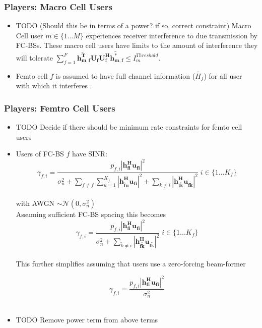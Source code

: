 \documentclass[12pt]{article}
\begin{document}
\subsubsection{Players: Macro Cell Users}

\begin{itemize}
\item 
TODO (Should this be in terms of a power? if so, correct constraint) 
Macro Cell user $m \in \{1 ... M\}$ experiences receiver interference to due transmission by FC-BSs. These macro cell users have limits to the amount of interference they will tolerate 
$\sum^F_{f=1} \mathbf{\tilde{h_{m,f}^T}}  \mathbf{U_f}  \mathbf{U_f^H} \mathbf{\tilde{h_{m,f}^*}} \leq I^{Threshold}_{m} $.

\item Femto cell $f$ is assumed to have full channel information ($\tilde{H_f}$) for all user with which it interferes .
\\
\end{itemize}


\subsubsection{Players: Femtro Cell Users}
\begin{itemize}


\item TODO Decide if there should be minimum rate constraints for femto cell users
\\

\item Users of FC-BS $f$ have SINR:
\begin{equation}
\gamma_{f,i} = \frac{p_{f,i}|\mathbf{h^H_{fi}u_{fi}}|^2}
{\sigma^2_{n}  + \sum_{\tilde{f}\neq f} \sum_{u=1}^{K_{\tilde{f}}}
|\mathbf{h^H_{\tilde{f}u}u_{fi}}|^2
 + \sum_{\tilde{k}\neq i}
  |\mathbf{h^H_{f\tilde{k}}u_{f\tilde{k}}}|^2}
  \; i \in \{1 ... K_f\}
\end{equation}
\\
with AWGN $\sim \mathcal{N}(0,\sigma^2_n)$
\\

Assuming sufficient FC-BS spacing this becomes 
\begin{equation}
\gamma_{f,i} = \frac{p_{f,i}|\mathbf{h^H_{fi}u_{fi}}|^2}{\sigma^2_{n}   + \sum_{\tilde{k}\neq i}
  |\mathbf{h^H_{f\tilde{k}}u_{f\tilde{k}}}|^2} \; i \in \{1 ... K_f\}
\end{equation}
\\

This further simplifies assuming that users use a zero-forcing beam-former

\begin{equation}
\gamma_{f,i} = \frac{p_{f,i}|\mathbf{h^H_{fi}u_{fi}}|^2}{\sigma^2_{n} }
\end{equation}
\\

\item TODO Remove power term from above terms
\\

\end{itemize}
\end{document}
